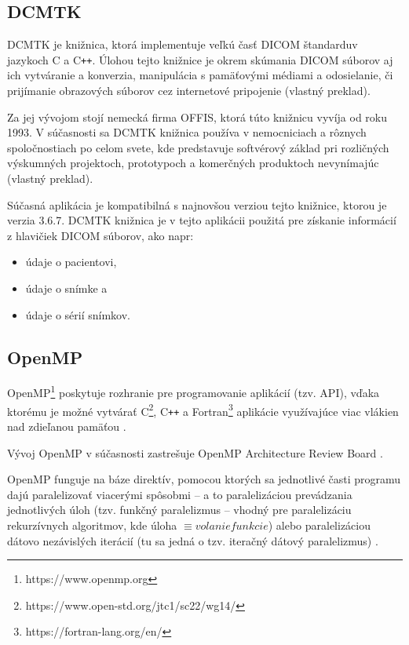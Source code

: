 \clearpage

\subsection {DCMTK}\label{dcmtk}
DCMTK je knižnica, ktorá implementuje veľkú časť DICOM štandardu\newline v jazykoch C a C\texttt{++}. Úlohou tejto knižnice je okrem skúmania DICOM súborov aj ich vytváranie a konverzia, manipulácia s pamäťovými médiami a odosielanie, či prijímanie obrazových súborov cez internetové pripojenie \cite{dcmtk_description} (vlastný preklad).

Za jej vývojom stojí nemecká firma OFFIS, ktorá túto knižnicu vyvíja od roku 1993. V súčasnosti sa DCMTK knižnica používa v nemocniciach a rôznych spoločnostiach po celom svete, kde predstavuje softvérový základ pri rozličných výskumných projektoch, prototypoch a komerčných produktoch nevynímajúc \cite{dcmtk_description} (vlastný preklad).

Súčasná aplikácia je kompatibilná s najnovšou verziou tejto knižnice, ktorou je verzia 3.6.7. DCMTK knižnica je v tejto aplikácii použitá pre získanie informácií z hlavičiek DICOM súborov, ako napr:
\begin{itemize}
\item {údaje o pacientovi,}
\item {údaje o snímke a}
\item {údaje o sérií snímkov.}
\end{itemize}

\subsection {OpenMP}\label{openmp}
OpenMP\footnote{https://www.openmp.org} poskytuje rozhranie pre programovanie aplikácií (tzv. API), vďaka ktorému je možné vytvárať C\footnote{https://www.open-std.org/jtc1/sc22/wg14/}, C\texttt{++} a Fortran\footnote{https://fortran-lang.org/en/} aplikácie využívajúce viac vlákien nad zdieľanou pamäťou \cite{openmp_description}.

Vývoj OpenMP v súčasnosti zastrešuje OpenMP Architecture Review Board \cite{openmp_description}.

OpenMP funguje na báze direktív, pomocou ktorých sa jednotlivé časti programu dajú paralelizovať viacerými spôsobmi -- a to paralelizáciou prevádzania jednotlivých úloh (tzv. funkčný paralelizmus -- vhodný pre paralelizáciu rekurzívnych algoritmov, kde úloha $\equiv{ volanie funkcie}$) alebo paralelizáciou dátovo nezávislých iterácií (tu sa jedná o tzv. iteračný dátový paralelizmus) \cite{openmp_description}.

